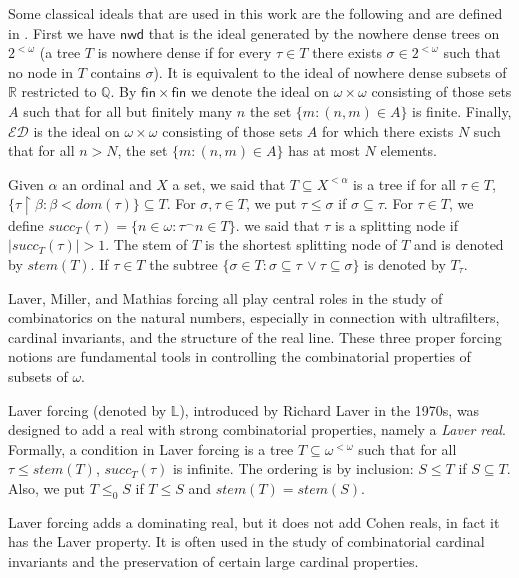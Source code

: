 \documentclass{amsart}
\theoremstyle{definition}
\theoremstyle{remark}
\numberwithin{equation}{section}
\newcommand{\nwd}{\mathsf{nwd}}
\newcommand{\fin}{\mathsf{fin}}
\newcommand{\ed}{\mathcal{E}\mathcal{D}}
\begin{document}
Some classical ideals that are used in this work are the following and are defined in \cite{hrusak}. First we have $\nwd$ that is the ideal generated by the nowhere dense trees on $2^{<\omega}$ (a tree $T$ is nowhere dense if for every $\tau\in T$ there exists $\sigma\in 2^{<\omega}$ such that no node in $T$ contains $\sigma$). It is equivalent to the ideal of nowhere dense subsets of $\mathbb{R}$ restricted to $\mathbb{Q}$. By $\fin \times \fin$ we denote the ideal on $\omega \times \omega$ consisting of those sets $A$ such that for all but finitely many $n$ the set $\{m : (n,m) \in A\}$ is finite. Finally, $\ed$ is the ideal on $\omega \times \omega$ consisting of those sets $A$ for which there exists $N$ such that for all $n > N$, the set $\{m : (n,m) \in A\}$ has at most $N$ elements.

Given $\alpha$ an ordinal and $X$ a set, we said that $T\subseteq X^{<\alpha}$ is a tree if for all $\tau\in T$, $\{\tau\upharpoonright\beta:\beta<dom(\tau)\}\subseteq T$. For $\sigma,\tau\in T$, we put $\tau\leq \sigma$ if $\sigma\subseteq \tau$. For $\tau\in T$, we define $succ_T(\tau)=\{ n \in \omega : \tau^\frown n \in T \}$. we said that $\tau$ is a splitting node if $|succ_T(\tau)|>1$. The stem of $T$ is the shortest splitting node of $T$ and is denoted by $stem(T)$. If $\tau\in T$ the subtree $\{\sigma\in T :\sigma \subseteq \tau \, \vee \tau\subseteq \sigma\}$ is denoted by $T_\tau$.

Laver, Miller, and Mathias forcing all play central roles in the study of combinatorics on the natural numbers, especially in connection with ultrafilters, cardinal invariants, and the structure of the real line. These three proper forcing notions are fundamental tools in controlling the combinatorial properties of subsets of  $\omega$.

Laver forcing (denoted by $\mathbb{L}$), introduced by Richard Laver in the 1970s, was designed to add a real with strong combinatorial properties, namely a \emph{Laver real}. Formally, a condition in Laver forcing is a tree $T \subseteq \omega^{<\omega}$ such that for all $\tau\leq stem(T)$, $succ_T(\tau)$ is infinite. The ordering is by inclusion: $S \leq T$ if $S \subseteq T$. Also, we put $T\leq_0 S$ if $T\leq S$ and $stem(T)=stem(S)$. 

Laver forcing adds a dominating real, but it does not add Cohen reals, in fact it has the Laver property. It is often used in the study of combinatorial cardinal invariants and the preservation of certain large cardinal properties.
\end{document}
